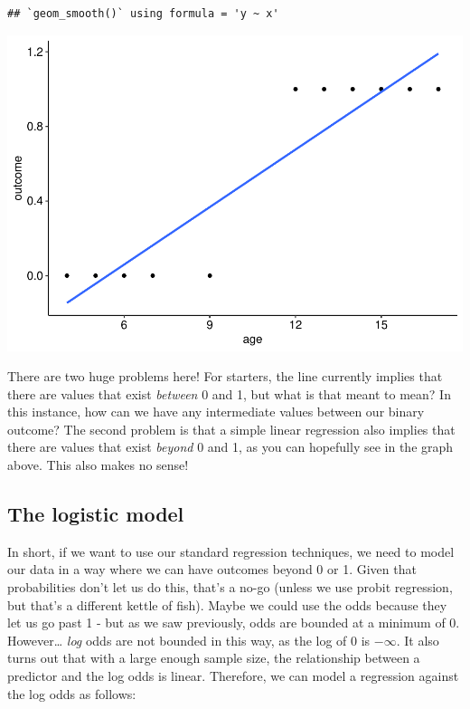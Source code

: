 \documentclass[
]{book}
\begin{document}
\begin{verbatim}
## `geom_smooth()` using formula = 'y ~ x'
\end{verbatim}

\includegraphics{_main_files/figure-latex/unnamed-chunk-304-1.pdf}

There are two huge problems here! For starters, the line currently implies that there are values that exist \emph{between} 0 and 1, but what is that meant to mean? In this instance, how can we have any intermediate values between our binary outcome? The second problem is that a simple linear regression also implies that there are values that exist \emph{beyond} 0 and 1, as you can hopefully see in the graph above. This also makes no sense!

\subsection{The logistic model}\label{the-logistic-model}

In short, if we want to use our standard regression techniques, we need to model our data in a way where we can have outcomes beyond 0 or 1. Given that probabilities don't let us do this, that's a no-go (unless we use probit regression, but that's a different kettle of fish). Maybe we could use the odds because they let us go past 1 - but as we saw previously, odds are bounded at a minimum of 0. However\ldots{} \emph{log} odds are not bounded in this way, as the log of 0 is \(- \infty\). It also turns out that with a large enough sample size, the relationship between a predictor and the log odds is linear. Therefore, we can model a regression against the log odds as follows:
\end{document}
